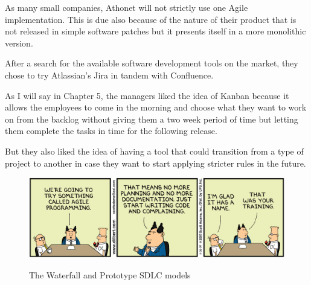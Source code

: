	As many small companies, Athonet will not strictly use one Agile implementation.
	This is due also because of the nature of their product that is not released in simple software patches but it presents itself in a more monolithic version.
	
	After a search for the available software development tools on the market, they chose to try Atlassian's Jira in tandem with Confluence.
	
	As I will say in Chapter 5, the managers liked the idea of Kanban because it allows the employees to come in the morning and choose what they want to work on from the backlog without giving them a two week period of time but letting them complete the tasks in time for the following release.
	
	But they also liked the idea of having a tool that could transition from a type of project to another in case they want to start applying stricter rules in the future.
	
	\begin{figure}[H]
		\centering
		\includegraphics[width=\textwidth]{resources/Dilbert_Training_Agile_Programming}\\
		\caption{The Waterfall and Prototype SDLC models}
	\end{figure}

